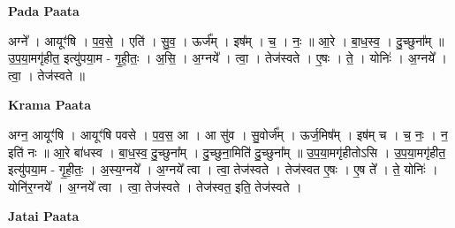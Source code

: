 \documentclass[17pt]{extarticle}
\begin{document}
\textbf{Pada Paata} \newline

अग्ने᳚ । आयूꣳ॑षि । प॒व॒से॒ । एति॑ । सु॒व॒ । ऊर्ज᳚म् । इष᳚म् । च॒ । नः॒ ॥ आ॒रे । बा॒ध॒स्व॒ । दु॒च्छुना᳚म् ॥ उ॒प॒या॒मगृ॑हीत॒ इत्यु॑पया॒म - गृ॒ही॒तः॒ । अ॒सि॒ । अ॒ग्नये᳚ । त्वा॒ । तेज॑स्वते । ए॒षः । ते॒ । योनिः॑ । अ॒ग्नये᳚ । त्वा॒ । तेज॑स्वते ॥  \newline


\textbf{Krama Paata} \newline

अग्न॒ आयूꣳ॑षि । आयूꣳ॑षि पवसे । प॒व॒स॒ आ । आ सु॑व । सु॒वोर्ज᳚म् । ऊर्ज॒मिष᳚म् । इष॑म् च । च॒ नः॒ । न॒ इति॑ नः ॥ आ॒रे बा॑धस्व । बा॒ध॒स्व॒ दु॒च्छुना᳚म् । दु॒च्छुना॒मिति॑ दु॒च्छुना᳚म् ॥ उ॒प॒या॒मगृ॑हीतोऽसि । उ॒प॒या॒मगृ॑हीत॒ इत्यु॑पया॒म - गृ॒ही॒तः॒ । अ॒स्य॒ग्नये᳚ । अ॒ग्नये᳚ त्वा । त्वा॒ तेज॑स्वते । तेज॑स्वत ए॒षः । ए॒ष ते᳚ । ते॒ योनिः॑ । योनि॑र॒ग्नये᳚ । अ॒ग्नये᳚ त्वा । त्वा॒ तेज॑स्वते । तेज॑स्वत॒ इति॒ तेज॑स्वते । \newline

\textbf{Jatai Paata} \newline
\end{document}
